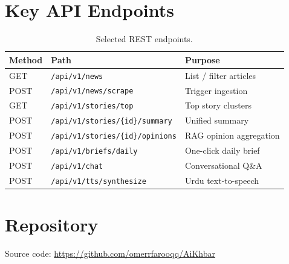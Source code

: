 \documentclass[11pt,a4paper]{article}
\begin{document}
\section{Key API Endpoints}
\begin{table}[h]
\centering
\begin{tabular}{@{}lll@{}}
\toprule
\textbf{Method} & \textbf{Path} & \textbf{Purpose} \\
\midrule
GET  & \texttt{/api/v1/news} & List / filter articles \\
POST & \texttt{/api/v1/news/scrape} & Trigger ingestion \\
GET  & \texttt{/api/v1/stories/top} & Top story clusters \\
POST & \texttt{/api/v1/stories/\{id\}/summary} & Unified summary \\
POST & \texttt{/api/v1/stories/\{id\}/opinions} & RAG opinion aggregation \\
POST & \texttt{/api/v1/briefs/daily} & One-click daily brief \\
POST & \texttt{/api/v1/chat} & Conversational Q\&A \\
POST & \texttt{/api/v1/tts/synthesize} & Urdu text-to-speech \\
\bottomrule
\end{tabular}
\caption{Selected REST endpoints.}
\end{table}

\section{Repository}
Source code: \url{https://github.com/omerrfarooqq/AiKhbar}
\end{document}
